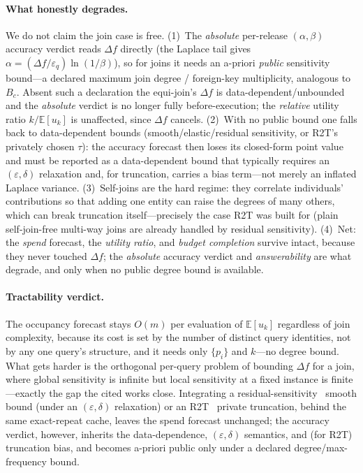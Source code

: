 \documentclass[sigconf,nonacm]{acmart}
\newcommand{\eps}{\varepsilon}
\newcommand{\E}{\mathbb{E}}
\begin{document}
\paragraph{What honestly degrades.}
We do not claim the join case is free. (1)~The \emph{absolute} per-release $(\alpha,\beta)$ accuracy verdict reads $\Delta f$ directly (the Laplace tail gives $\alpha=(\Delta f/\eps_q)\ln(1/\beta)$), so for joins it needs an a-priori \emph{public} sensitivity bound---a declared maximum join degree / foreign-key multiplicity, analogous to $B_c$. Absent such a declaration the equi-join's $\Delta f$ is data-dependent/unbounded and the \emph{absolute} verdict is no longer fully before-execution; the \emph{relative} utility ratio $k/\E[u_k]$ is unaffected, since $\Delta f$ cancels. (2)~With no public bound one falls back to data-dependent bounds (smooth/elastic/residual sensitivity, or R2T's privately chosen $\tau$): the accuracy forecast then loses its closed-form point value and must be reported as a data-dependent bound that typically requires an $(\eps,\delta)$ relaxation and, for truncation, carries a bias term---not merely an inflated Laplace variance. (3)~Self-joins are the hard regime: they correlate individuals' contributions so that adding one entity can raise the degrees of many others, which can break truncation itself---precisely the case R2T was built for (plain self-join-free multi-way joins are already handled by residual sensitivity). (4)~Net: the \emph{spend} forecast, the \emph{utility ratio}, and \emph{budget completion} survive intact, because they never touched $\Delta f$; the \emph{absolute} accuracy verdict and \emph{answerability} are what degrade, and only when no public degree bound is available.

\paragraph{Tractability verdict.}
The occupancy forecast stays $O(m)$ per evaluation of $\E[u_k]$ regardless of join complexity, because its cost is set by the number of distinct query identities, not by any one query's structure, and it needs only $\{p_i\}$ and $k$---no degree bound. What gets harder is the orthogonal per-query problem of bounding $\Delta f$ for a join, where global sensitivity is infinite but local sensitivity at a fixed instance is finite---exactly the gap the cited works close. Integrating a residual-sensitivity~\cite{dong2021residual} smooth bound (under an $(\eps,\delta)$ relaxation) or an R2T~\cite{dong2022r2t} private truncation, behind the same exact-repeat cache, leaves the spend forecast unchanged; the accuracy verdict, however, inherits the data-dependence, $(\eps,\delta)$ semantics, and (for R2T) truncation bias, and becomes a-priori public only under a declared degree/max-frequency bound.
\end{document}
